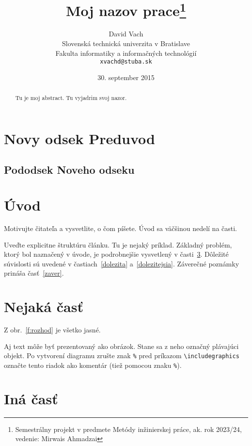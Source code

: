 \documentclass[10pt,twoside,slovak,a4paper]{article}
\title{Moj nazov prace\thanks{Semestrálny projekt v predmete Metódy inžinierskej práce, ak. rok 2023/24, vedenie: Mirwais Ahmadzai}} %
\author{David Vach\\[2pt]
	{\small Slovenská technická univerzita v Bratislave}\\
	{\small Fakulta informatiky a informačných technológií}\\
	{\small \texttt{xvachd@stuba.sk}}
	}
\date{\small 30. september 2015} %
\begin{document}
\maketitle

\begin{abstract}
Tu je moj abstract. Tu vyjadrim svoj nazor. 
\end{abstract}

\section{Novy odsek Preduvod}


\subsection{Pododsek Noveho odseku}




\section{Úvod}

Motivujte čitateľa a vysvetlite, o čom píšete. Úvod sa väčšinou nedelí na časti.

Uveďte explicitne štruktúru článku. Tu je nejaký príklad.
Základný problém, ktorý bol naznačený v úvode, je podrobnejšie vysvetlený v časti~\ref{nejaka}.
Dôležité súvislosti sú uvedené v častiach~\ref{dolezita} a~\ref{dolezitejsia}.
Záverečné poznámky prináša časť~\ref{zaver}.



\section{Nejaká časť} \label{nejaka}

Z obr.~\ref{f:rozhod} je všetko jasné. 

\begin{figure*}[tbh]
\centering
Aj text môže byť prezentovaný ako obrázok. Stane sa z neho označný plávajúci objekt. Po vytvorení diagramu zrušte znak \texttt{\%} pred príkazom \verb|\includegraphics| označte tento riadok ako komentár (tiež pomocou znaku \texttt{\%}).
\caption{Rozhodujúci argument.}
\label{f:rozhod}
\end{figure*}



\section{Iná časť} \label{ina}
\end{document}
